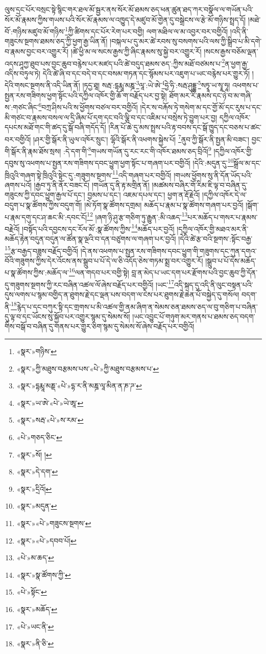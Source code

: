 ལུས་དྲང་པོར་བསྲང་སྟེ་སྙིང་གར་ཐལ་མོ་སྦྱར་ནས་སོར་མོ་ཐམས་ཅད་ཕན་ཚུན་ཐད་ཀར་བསྣོལ་ལ་གཡོན་པའི་སོར་མོ་རྣམས་ཀྱིས་གཡས་པའི་སོར་མོ་རྣམས་ལ་འཁྱུད་དེ་མཛུབ་མོ་གྱེན་དུ་བསྒྲེངས་ལ་རྩེ་མོ་གཉིས་སྤྲད་དོ། །མཐེ་བོ་:གཉིས་མཛུབ་མོ་གཉིས་\footnote{«སྣར་»གཉིས་}ཀྱི་ཚིགས་དང་པོར་རེག་པར་བགྱི། ལག་མཐིལ་ལ་མ་འབྱར་བར་བགྱིའོ། །འདི་ནི་གཟུངས་སྔགས་ཐམས་ཅད་ཀྱི་ཕྱག་རྒྱ་ཡིན་ནོ། །བསྐལ་པ་དུ་མར་ཚེ་རབས་སུ་བསགས་པའི་ལས་ཀྱི་སྒྲིབ་པ་མི་དགེ་བ་རྣམས་བྱང་བར་འགྱུར་རོ། །ཚེ་ཕྱི་མ་ལ་སངས་རྒྱས་ཀྱི་ཞིང་རྣམས་སུ་སྐྱེ་བར་འགྱུར་རོ། །སངས་རྒྱས་བཅོམ་ལྡན་འདས་ཤཱཀྱ་ཐུབ་པས་བྱང་ཆུབ་བརྙེས་པར་མཛད་པའི་ཚེ་བདུད་ཐམས་ཅད་:ཀྱིས་མཐོ་བཙམས་པ་\footnote{«སྣར་»ཀྱི་མཐུས་བརྩམས་པས་«པེ་»ཀྱི་མཐུས་བརྩམས་པ་}ན་ཕྱག་རྒྱ་འདིས་བཏུལ་ཏེ། དེའི་ཚེ་ཞི་བ་དང་བདེ་བ་དང་བསམ་གཏན་དང་སྙོམས་པར་འཇུག་པ་ཡང་བརྙེས་པར་གྱུར་ཏོ། །དེའི་གསང་སྔགས་ནི་འདི་ཡིན་ནོ། །ཏདྱ་ཐཱ། སརྦ་:དྷརྨཱ་མཎྜ་\footnote{«སྣར་»དྷརྨཱ་མཎྡ་«པེ་»དྷ་ར་ནི་མཎྜ་ལཱ་མིན་ན་ཎ་ཌ་}ལཱ་:ཡེ་ཨེ་\footnote{«སྣར་»ཡ་ཨེ་«པེ་»ཡེ་ཨཱ་}ཧྱེ་ཧི་:སརྦ་ཤུདྡྷ་\footnote{«སྣར་»སརྦ་«པེ་»ས་རམ་}སཏྭཱ་ཡ་སྭཱ་ཧཱ། འཕགས་པ་སྤྱན་རས་གཟིགས་ཕྱག་སྟོང་པའི་དཀྱིལ་འཁོར་གྱི་ཆོ་ག་བརྗོད་པར་བྱ་སྟེ། ཐོག་མར་རི་རྣམས་དང་ཉེ་བ་མ་གཞི་ས་:གཙང་ཞིང་\footnote{«པེ་»གཅད་ཅིང་}བཀྲ་ཤིས་པའི་ས་ཕྱོགས་བཙལ་བར་བགྱིའོ། །དེར་ས་བརྐོས་ཏེ་གསེག་མ་དང་གྱོ་མོ་དང་རུས་པ་དང་མི་གཙང་བ་རྣམས་བསལ་ལ་དྲི་ཞིམ་པོ་དག་དང་བའི་ལྕི་བ་དང་འཇིམ་པ་བསྲེས་ཏེ་བྱུག་པར་བྱ། དཀྱིལ་འཁོར་དཔངས་མཐོ་གང་གི་ཚད་དུ་སྒོ་བཞི་གདོད་དོ། །རིན་པོ་ཆེ་དུ་མས་སྤྲས་པའི་རྟ་བབས་དང་སྒོ་ཁྱུད་དང་བཅས་པ་ཚང་བར་བགྱིའོ། །ཤར་གྱི་སྒོར་ནི་ཡུལ་འཁོར་སྲུང་། ལྷོའི་སྒོར་ནི་འཕགས་སྐྱེས་པོ། \footnote{«སྣར་»སོ། ། }ནུབ་ཀྱི་སྒོར་ནི་སྤྱན་མི་བཟང་། བྱང་གི་སྒོར་ནི་རྣམ་ཐོས་སྲས། :དེ་དག་གི་\footnote{«སྣར་»དེ་དག་}གཡས་གཡོན་དུ་རང་རང་གི་འཁོར་ཐམས་ཅད་བྲིའོ།\footnote{«སྣར་»དྲིའོ།} །དཀྱིལ་འཁོར་གྱི་དབུས་སུ་འཕགས་པ་སྤྱན་རས་གཟིགས་དབང་ཕྱུག་ཕྱག་སྟོང་པ་གཞག་པར་བགྱིའོ། །དེའི་:མདུན་དུ་\footnote{«སྣར་»མདུན་}སྒྲོལ་མ་དང་ཁྲིའུའི་གཞག་སྟེ་ཁྲིའུའི་སྟེང་དུ་:གཟུགས་སྔགས་\footnote{«སྣར་»«པེ་»གཟུངས་སྔགས་}འདི་གཞག་པར་བགྱིའོ། །གཡས་ཕྱོགས་སུ་ནི་དོན་ཡོད་པའི་ཞགས་པའོ། །རྒྱབ་ཏུ་ནི་ནོར་བཟང་ངོ། །གཡོན་དུ་ནི་རྟ་མགྲིན་ནོ། །མཚམས་བཞིར་གོ་རིམ་ཇི་ལྟ་བ་བཞིན་དུ་གཟུངས་ཀྱི་དབང་ཕྱུག་རྒྱལ་པོ་དང་། བྱམས་པ་དང་། འཇམ་དཔལ་དང་། ཕྱག་ན་རྡོ་རྗེའོ། །དཀྱིལ་འཁོར་དེ་ལ་བདུག་པ་སྣ་ཚོགས་ཀྱིས་བདུག་གོ། །མེ་ཏོག་སྣ་ཚོགས་དགྲམ། མཆོད་པ་རྣམ་པ་སྣ་ཚོགས་གཞག་པར་བྱའོ། །སྒོག་པ་རྣམ་དགུ་དང་ཤ་ཆང་མི་:དབང་ངོ།\footnote{«སྣར་»«པེ་»དབབ་པོ།} །ཞག་ཉི་ཤུ་རྩ་གཅིག་ཏུ་རྒྱུན་:མི་འཆད་\footnote{«པེ་»མ་ཆད་}པར་མཆོད་པ་གསར་པ་རྣམས་བརྗེའོ། །བསྟོད་པའི་དབྱངས་དང་རོལ་མོ་:སྣ་ཚོགས་ཀྱིས་\footnote{«སྣར་»སྣ་ཚོགས་ཀྱི་}མཆོད་པར་བྱའོ། །དཀྱིལ་འཁོར་གྱི་མཐའ་མར་ནི་མཆོད་རྟེན་བདུན་བདུན་ལ་ཚོན་སྣ་ལྔའི་བ་དན་བཙུགས་ལ་གཞག་པར་བྱའོ། །དེའི་ཚེ་རྩ་བའི་སྔགས་:སྟོང་བརྒྱ་\footnote{«པེ་»སྟོང་}རྩ་བརྒྱད་བཟླས་བརྗོད་བགྱིའོ། །དེ་ནས་འཕགས་པ་སྤྱན་རས་གཟིགས་དབང་ཕྱུག་གི་གཟུགས་དང་ཀུན་དགའ་བོའི་གཟུགས་ཀྱིས་དེར་འོངས་ནས་སྒྲུབ་པ་པོ་དེ་ལ་ཅི་འདོད་ཅེས་གཏམ་སྨྲ་བར་འགྱུར་རོ། །སྒྲུབ་པ་པོ་དེས་མཆོད་པ་སྣ་ཚོགས་ཀྱིས་:མཆོད་ལ་\footnote{«སྣར་»མཆོད་}ལན་གདབ་པར་བགྱི་སྟེ། བླ་ན་མེད་པ་ཡང་དག་པར་རྫོགས་པའི་བྱང་ཆུབ་ཀྱི་དོན་དུ་གཟུགས་སྔགས་ཀྱི་རང་བཞིན་འཚལ་ལོ་ཞེས་བརྗོད་པར་བགྱིའོ། །ཡང་\footnote{«པེ་»ཡང་ནི་}འདི་སྐད་དུ་འདི་ནི་ལུང་བསྟན་པའི་དུས་ལགས་པ་སྙམ་བགྱིད་ན་ཐུགས་རྗེ་དང་ལྡན་པས་བདག་ལ་ངེས་པར་ཐུགས་རྗེ་ཆེན་པོ་བསྐྱེད་དུ་གསོལ། བདག་ནི་\footnote{«སྣར་»ནི་ཅི་}རྙེད་པ་དང་བཀུར་སྟི་དང་གྲགས་པ་མི་འཚལ་གྱི་ནམ་ཞིག་ན་སེམས་ཅན་ཐམས་ཅད་ལ་བུ་གཅིག་པ་བཞིན་དུ་ལྟ་བ་དང་ཡོངས་སུ་སྐྱོབ་པར་འགྱུར་སྙམ་དུ་སེམས་སོ། །ཡང་འབྱུང་པོ་གཉུག་མར་གནས་པ་ཐམས་ཅད་བདག་གིས་བསྒོ་བ་བཞིན་དུ་གནས་པར་གྱུར་ཅིག་སྙམ་དུ་སེམས་སོ་ཞེས་བརྗོད་པར་བགྱིའོ། 